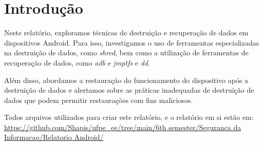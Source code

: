 \section{Introdução}

Neste relatório, exploramos técnicas de destruição e recuperação de dados em dispositivos Android. Para isso, investigamos o uso de ferramentas especializadas na destruição de dados, como \emph{shred}, bem como a utilização de ferramentas de recuperação de dados, como \emph{adb} e \emph{jmptfs} e \emph{dd}.

Além disso, abordamos a restauração do funcionamento do dispositivo após a destruição de dados e alertamos sobre as práticas inadequadas de destruição de dados que podem permitir restaurações com fins maliciosos.

Todos arquivos utilizados para criar este relatório, e o relatório em si estão em:  \url{https://github.com/Shapis/ufpe_ee/tree/main/6th semester/Seguranca da Informacao/Relatorio Android/}